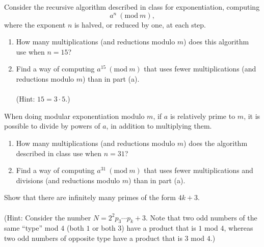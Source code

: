 \documentclass[12pt,letterpaper]{hmcpset}
\renewcommand{\t}[1]{\text{#1}}
\begin{document}

\begin{problem}[1]
    Consider the recursive algorithm described in class for exponentiation, computing 
    \[
        a^n\:(\t{mod}~m),
    \]
    where the exponent $n$ is halved, or reduced by one, at each step.
    \begin{enumerate}
        \item How many multiplications (and reductions modulo $m$) does this algorithm use when $n=15$?
        \item Find a way of computing $a^{15}\:(\t{mod}~m)$ that uses fewer multiplications (and reductions modulo $m$) than in part (a).\\\\
            (Hint: $15 =3\cdot5$.)
    \end{enumerate}
\end{problem}
\begin{solution}
    \vfill
\end{solution}
\newpage

\begin{problem}[2]
    When doing modular exponentiation modulo $m$, if $a$ is relatively prime to $m$, it is possible to divide by powers of $a$, in addition to multiplying them.
    \begin{enumerate}
        \item How many multiplications (and reductions modulo $m$) does the algorithm described in class use when $n=31$?
        \item Find a way of computing $a^{31}\:(\t{mod}~m)$ that uses fewer multiplications and divisions (and reductions modulo $m$) than in part (a).
    \end{enumerate}
\end{problem}
\begin{solution}
    \vfill
\end{solution}
\newpage

\begin{problem}[3]
    Show that there are infinitely  many primes of the form $4k+3$.\\\\
    (Hint: Consider the number $N=2^2p_3\cdots p_k+3$. Note that two odd numbers of the same ``type'' mod $4$ (both $1$ or both $3$) have a product that is $1$ mod $4$, whereas two odd numbers of opposite type have a product that is $3$ mod $4$.)
\end{problem}
\begin{solution}
    \vfill
\end{solution}
\newpage
\end{document}
